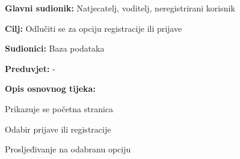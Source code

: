 					\noindent {}
					\begin{packed_item}
	
						\item \textbf{Glavni sudionik: }Natjecatelj, voditelj, neregistrirani korisnik
						\item  \textbf{Cilj:} Odlučiti se za opciju registracije ili prijave
						\item  \textbf{Sudionici:} Baza podataka
						\item  \textbf{Preduvjet:} -
						\item  \textbf{Opis osnovnog tijeka:}
						
						\item[] \begin{packed_enum}
	
							\item Prikazuje se početna stranica
							\item Odabir prijave ili registracije
							\item Prosljeđivanje na odabranu opciju
							
						\end{packed_enum}
					\end{packed_item}
					
